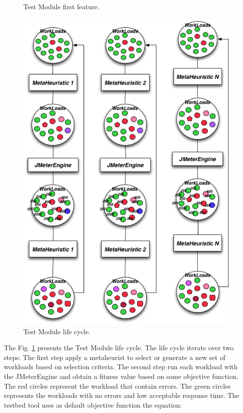 \begin{figure}[h]
\begin{minipage}{.5\textwidth}
\caption{Test Module first feature.}
\label{fig:step1}
\end{minipage}
\begin{minipage}{.5\textwidth}
\centering
\includegraphics[width=1\textwidth]{./images/step2.png}
\caption{Test Module life cycle.}
\label{fig:step2}
\end{minipage}
\end{figure} 

The Fig. \ref{fig:step2} presents the Test Module life cycle. The life cycle iterate over two steps: The first step apply a metaheurist to select or generate a new set of workloads based on selection criteria. The second step run each workload with the JMeterEngine and obtain a fitness value based on some objective function. The red circles represent the workload that contain errors. The green circles represents the workloads with no errors and low acceptable response time. The testbed tool uses as default objective function the equation:


